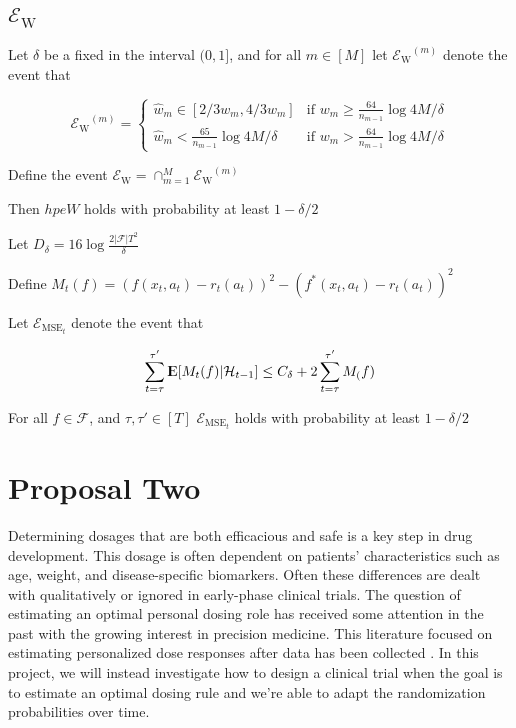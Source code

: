 \documentclass[12pt,,letterpaper,twoside]{report}
\DeclareMathOperator{\E}{{\rm I\kern-.3em E}}
\newcommand{\mcF}{{\mathcal{F}}}
\newcommand{\mcH}{{\mathcal{H}}}
\newcommand{\hpeMt}{{\mathcal{E}_{\text{MSE}_t}}}
\newcommand{\hpeW}{{\mathcal{E}_{\mathrm{W}}}}
\begin{document}
\hypertarget{hpew}{%
\subsection{\texorpdfstring{\(\hpeW\)}{\textbackslash hpeW}}\label{hpew}}

Let \(\delta\) be a fixed in the interval \((0, 1]\), and for all
\(m \in [M]\) let \(\hpeW^{(m)}\) denote the event that

\[\hpeW^{(m)} = \begin{cases} \widehat{w}_m \in [2/3 w_m, 4/3w_m] & \text{if } w_m \geq \frac{64}{n_{m-1}} \log{4M/\delta} \\ \widehat{w}_m < \frac{65}{n_{m-1}} \log{4M/\delta} & \text{if } w_m > \frac{64}{n_{m-1}} \log{4M/\delta}
\end{cases}\]

Define the event \(\hpeW = \cap_{m = 1}^{M} \hpeW^{(m)}\)

Then \(hpeW\) holds with probability at least \(1 - \delta/2\)

Let \(D_{\delta} = 16 \log{\frac{2 | \mcF | T^2 }{\delta}}\)

Define
\(M_t(f) = \left(f(x_t, a_t) - r_t(a_t) \right)^2 - \left(f^*(x_t, a_t) - r_t(a_t) \right)^2\)

Let \(\hpeMt\) denote the event that

\[\sum_{t = \tau}^{\tau'} \E[M_t(f) | \mcH_{t - 1} ] \leq C_{\delta} + 2 \sum_{t = \tau}^{\tau'}M_(f)\]

For all \(f \in \mcF\), and \(\tau, \tau' \in [T]\) \(\hpeMt\) holds
with probability at least \(1-\delta / 2\)

\hypertarget{proposal-two}{%
\section{Proposal Two}\label{proposal-two}}

Determining dosages that are both efficacious and safe is a key step in
drug development. This dosage is often dependent on patients'
characteristics such as age, weight, and disease-specific biomarkers.
Often these differences are dealt with qualitatively or ignored in
early-phase clinical trials. The question of estimating an optimal
personal dosing role has received some attention in the past with the
growing interest in precision medicine. This literature focused on
estimating personalized dose responses after data has been collected
\citep{chen2016personalized, zhu2020kernel, zhou2021parsimonious}. In
this project, we will instead investigate how to design a clinical trial
when the goal is to estimate an optimal dosing rule and we're able to
adapt the randomization probabilities over time.
\end{document}
